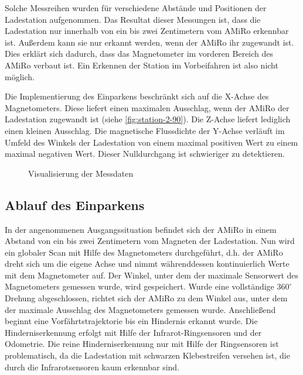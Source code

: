 Solche Messreihen wurden für verschiedene Abstände und Positionen der Ladestation aufgenommen. Das Resultat dieser Messungen ist, dass die Ladestation nur innerhalb von ein bis zwei Zentimetern vom AMiRo erkennbar ist. Außerdem kann sie nur erkannt werden, wenn der AMiRo ihr zugewandt ist. Dies erklärt sich dadurch, dass das Magnetometer im vorderen Bereich des AMiRo verbaut ist. Ein Erkennen der Station im Vorbeifahren ist also nicht möglich.

Die Implementierung des Einparkens beschränkt sich auf die X-Achse des Magnetometers. Diese liefert einen maximalen Ausschlag, wenn der AMiRo der Ladestation zugewandt ist (siehe \ref{fig:station-2-90}). Die Z-Achse liefert lediglich einen kleinen Ausschlag. Die magnetische Flussdichte der Y-Achse verläuft im Umfeld des Winkels der Ladestation von einem maximal positiven Wert zu einem maximal negativen Wert. Dieser Nulldurchgang ist schwieriger zu detektieren.


\begin{figure}
	\caption{Visualisierung der Messdaten}
	\label{fig:messdaten}
\end{figure}

\subsection{Ablauf des Einparkens}
In der angenommenen Ausgangssituation befindet sich der AMiRo in einem Abstand von ein bis zwei Zentimetern vom Magneten der Ladestation. Nun wird ein globaler Scan mit Hilfe des Magnetometers durchgeführt, d.h. der AMiRo dreht sich um die eigene Achse und nimmt währenddessen kontinuierlich Werte mit dem Magnetometer auf. Der Winkel, unter dem der maximale Sensorwert des Magnetometers gemessen wurde, wird gespeichert. Wurde eine vollständige $360^\circ$ Drehung abgeschlossen, richtet sich der AMiRo zu dem Winkel aus, unter dem der maximale Ausschlag des Magnetometers gemessen wurde. Anschließend beginnt eine Vorfährtstrajektorie bis ein Hindernis erkannt wurde. Die Hinderniserkennung erfolgt mit Hilfe der Infrarot-Ringsensoren und der Odometrie. Die reine Hinderniserkennung nur mit Hilfe der Ringsensoren ist problematisch, da die Ladestation mit schwarzen Klebestreifen versehen ist, die durch die Infrarotsensoren kaum erkennbar sind.

